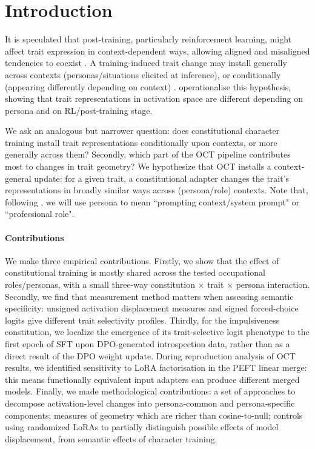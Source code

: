 \documentclass{article}
\begin{document}
\section{Introduction}
It is speculated that post-training, particularly reinforcement learning, might affect trait expression in context-dependent ways, allowing aligned and misaligned tendencies to coexist \citep{Betley2026SplitPersonas}. A training-induced trait change may install generally across contexts (personas/situations elicited at inference), or conditionally (appearing differently depending on context) \citep{Dubinski2026ConditionalMisalignment}. \citet{davies2026personas} operationalise this hypothesis, showing that trait representations in activation space are different depending on persona and on RL/post-training stage. 

We ask an analogous but narrower question: does constitutional character training \citep{maiya2025opencharactertrainingshaping} install trait representations conditionally upon contexts, or more generally across them? Secondly, which part of the OCT pipeline contributes most to changes in trait geometry?  We hypothesize that OCT installs a context-general update: for a given trait, a constitutional adapter changes the trait's representations in broadly similar ways across (persona/role) contexts. Note that, following \citet{davies2026personas}, we will use persona to mean  ``prompting context/system prompt" or ``professional role".

\paragraph{Contributions}
We make three empirical contributions. Firstly, we show that the effect of constitutional training is mostly shared across the tested occupational roles/personas, with a small three-way constitution $\times$ trait $\times$ persona interaction. Secondly, we find that measurement method matters when assessing semantic specificity: unsigned activation displacement measures and signed forced-choice logits give different trait selectivity profiles. Thirdly, for the impulsiveness constitution, we localize the emergence of its trait-selective logit phenotype to the first epoch of SFT upon DPO-generated introspection data, rather than as a direct result of the DPO weight update. During reproduction analysis of OCT results, we identified sensitivity to LoRA factorisation in the PEFT linear merge: this means functionally equivalent input adapters can produce different merged models. Finally, we made methodological contributions: a set of approaches to decompose activation-level changes into persona-common and persona-specific components; measures of geometry which are richer than cosine-to-null; controls using randomized LoRAs to partially distinguish possible effects of model displacement, from semantic effects of character training. 
\end{document}
